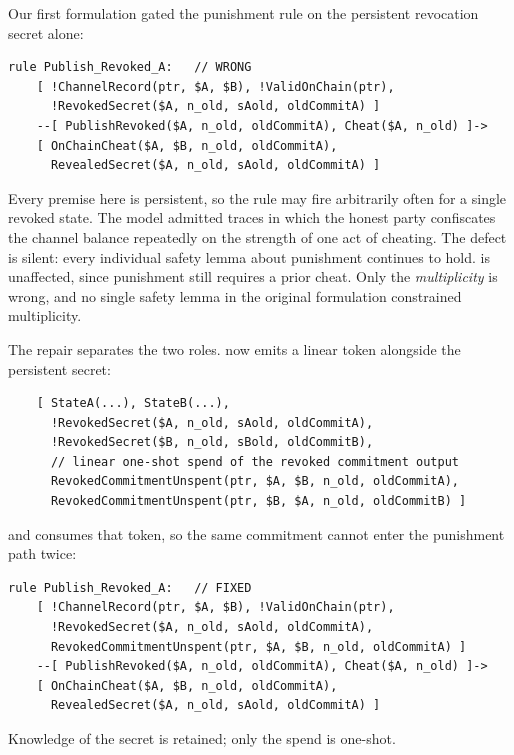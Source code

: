 Our first formulation gated the punishment rule on the persistent revocation
secret alone:

\begin{lstlisting}
rule Publish_Revoked_A:   // WRONG
    [ !ChannelRecord(ptr, $A, $B), !ValidOnChain(ptr),
      !RevokedSecret($A, n_old, sAold, oldCommitA) ]
    --[ PublishRevoked($A, n_old, oldCommitA), Cheat($A, n_old) ]->
    [ OnChainCheat($A, $B, n_old, oldCommitA),
      RevealedSecret($A, n_old, sAold, oldCommitA) ]
\end{lstlisting}

Every premise here is persistent, so the rule may fire arbitrarily often for a
single revoked state. The model admitted traces in which the honest party
confiscates the channel balance repeatedly on the strength of one act of
cheating. The defect is silent: every individual safety lemma about punishment
continues to hold.  is unaffected, since
punishment still requires a prior cheat. Only the \emph{multiplicity} is wrong,
and no single safety lemma in the original formulation constrained
multiplicity.

The repair separates the two roles.  now emits a
linear token alongside the persistent secret:

\begin{lstlisting}
    [ StateA(...), StateB(...),
      !RevokedSecret($A, n_old, sAold, oldCommitA),
      !RevokedSecret($B, n_old, sBold, oldCommitB),
      // linear one-shot spend of the revoked commitment output
      RevokedCommitmentUnspent(ptr, $A, $B, n_old, oldCommitA),
      RevokedCommitmentUnspent(ptr, $B, $A, n_old, oldCommitB) ]
\end{lstlisting}

and  consumes that token, so the same commitment
cannot enter the punishment path twice:

\begin{lstlisting}
rule Publish_Revoked_A:   // FIXED
    [ !ChannelRecord(ptr, $A, $B), !ValidOnChain(ptr),
      !RevokedSecret($A, n_old, sAold, oldCommitA),
      RevokedCommitmentUnspent(ptr, $A, $B, n_old, oldCommitA) ]
    --[ PublishRevoked($A, n_old, oldCommitA), Cheat($A, n_old) ]->
    [ OnChainCheat($A, $B, n_old, oldCommitA),
      RevealedSecret($A, n_old, sAold, oldCommitA) ]
\end{lstlisting}

Knowledge of the secret is retained; only the spend is one-shot.

